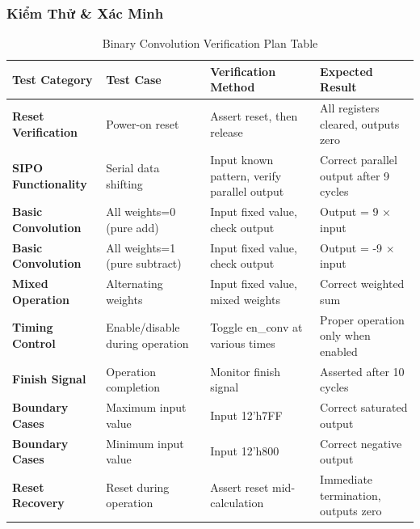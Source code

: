 \subsubsection{Kiểm Thử \& Xác Minh}
\begin{table}[h]
\centering
\caption{Binary Convolution Verification Plan Table}
\begin{tabular}{>{\bfseries}p{2.5cm}p{4cm}p{4cm}p{3cm}}
\toprule
\textbf{Test Category} & \textbf{Test Case} & \textbf{Verification Method} & \textbf{Expected Result} \\
\midrule
Reset Verification & Power-on reset & Assert reset, then release & All registers cleared, outputs zero \\
\hline
SIPO Functionality & Serial data shifting & Input known pattern, verify parallel output & Correct parallel output after 9 cycles \\
\hline
Basic Convolution & All weights=0 (pure add) & Input fixed value, check output & Output = 9 × input \\
\hline
Basic Convolution & All weights=1 (pure subtract) & Input fixed value, check output & Output = -9 × input \\
\hline
Mixed Operation & Alternating weights & Input fixed value, mixed weights & Correct weighted sum \\
\hline
Timing Control & Enable/disable during operation & Toggle en\_conv at various times & Proper operation only when enabled \\
\hline
Finish Signal & Operation completion & Monitor finish signal & Asserted after 10 cycles \\
\hline
Boundary Cases & Maximum input value & Input 12'h7FF & Correct saturated output \\
\hline
Boundary Cases & Minimum input value & Input 12'h800 & Correct negative output \\
\hline
Reset Recovery & Reset during operation & Assert reset mid-calculation & Immediate termination, outputs zero \\
\bottomrule
\end{tabular}
\end{table}

